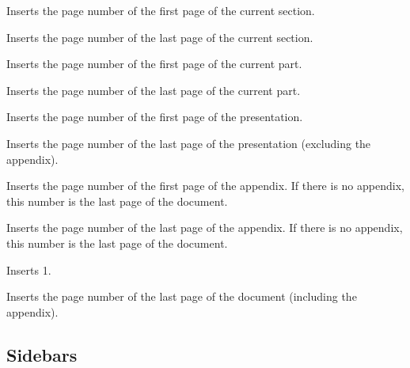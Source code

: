 \begin{command}{\insertsectionstartpage}
  Inserts the page number of the first page of the current section.
\end{command}

\begin{command}{\insertsectionendpage}
  Inserts the page number of the last page of the current section.
\end{command}

\begin{command}{\insertpartstartpage}
  Inserts the page number of the first page of the current part.
\end{command}

\begin{command}{\insertpartendpage}
  Inserts the page number of the last page of the current part.
\end{command}

\begin{command}{\insertpresentationstartpage}
  Inserts the page number of the first page of the presentation.
\end{command}

\begin{command}{\insertpresentationendpage}
  Inserts the page number of the last page of the presentation
  (excluding the appendix).
\end{command}


\begin{command}{\insertappendixstartpage}
  Inserts the page number of the first page of the appendix. If there
  is no appendix, this number is the last page of the document.
\end{command}

\begin{command}{\insertappendixendpage}
  Inserts the page number of the last page of the appendix. If there
  is no appendix, this number is the last page of the document.
\end{command}

\begin{command}{\insertdocumentstartpage}
  Inserts 1.
\end{command}

\begin{command}{\insertdocumentendpage}
  Inserts the page number of the last page of the document (including
  the appendix).
\end{command}




\subsection{Sidebars}

